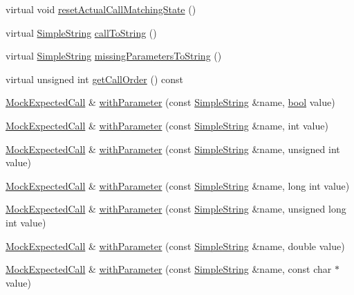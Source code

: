 \begin{DoxyCompactItemize}
virtual void \hyperlink{class_mock_checked_expected_call_a4c7ee87e12972e0504de732ae6f90177}{reset\+Actual\+Call\+Matching\+State} ()
\item 
virtual \hyperlink{class_simple_string}{Simple\+String} \hyperlink{class_mock_checked_expected_call_a50b6582b02a3b9bb3c8836ea31698b4d}{call\+To\+String} ()
\item 
virtual \hyperlink{class_simple_string}{Simple\+String} \hyperlink{class_mock_checked_expected_call_a65070227a3d996e9a1cc256fa19c440a}{missing\+Parameters\+To\+String} ()
\item 
virtual unsigned int \hyperlink{class_mock_checked_expected_call_a07001b75a2bd64a89534e601578e6b2a}{get\+Call\+Order} () const 
\item 
\hyperlink{class_mock_expected_call}{Mock\+Expected\+Call} \& \hyperlink{class_mock_expected_call_a9d735dfb585c1351650fcfad40f138bc}{with\+Parameter} (const \hyperlink{class_simple_string}{Simple\+String} \&name, \hyperlink{avb__gptp_8h_af6a258d8f3ee5206d682d799316314b1}{bool} value)
\item 
\hyperlink{class_mock_expected_call}{Mock\+Expected\+Call} \& \hyperlink{class_mock_expected_call_a8f249d5f2a770017be7a146ad4c28022}{with\+Parameter} (const \hyperlink{class_simple_string}{Simple\+String} \&name, int value)
\item 
\hyperlink{class_mock_expected_call}{Mock\+Expected\+Call} \& \hyperlink{class_mock_expected_call_a342cb778380da454c56e240fae0186be}{with\+Parameter} (const \hyperlink{class_simple_string}{Simple\+String} \&name, unsigned int value)
\item 
\hyperlink{class_mock_expected_call}{Mock\+Expected\+Call} \& \hyperlink{class_mock_expected_call_a0c84c6e3e39eef70254a71e4b7e275f8}{with\+Parameter} (const \hyperlink{class_simple_string}{Simple\+String} \&name, long int value)
\item 
\hyperlink{class_mock_expected_call}{Mock\+Expected\+Call} \& \hyperlink{class_mock_expected_call_adf4fe75932c7d2ce5f6ca5b4a8bece96}{with\+Parameter} (const \hyperlink{class_simple_string}{Simple\+String} \&name, unsigned long int value)
\item 
\hyperlink{class_mock_expected_call}{Mock\+Expected\+Call} \& \hyperlink{class_mock_expected_call_ab554906346659e0f70f7764ed1fd3f28}{with\+Parameter} (const \hyperlink{class_simple_string}{Simple\+String} \&name, double value)
\item 
\hyperlink{class_mock_expected_call}{Mock\+Expected\+Call} \& \hyperlink{class_mock_expected_call_ac5f6920554d1ecc0a9bbf417d5c69375}{with\+Parameter} (const \hyperlink{class_simple_string}{Simple\+String} \&name, const char $\ast$value)

\end{DoxyCompactItemize}

